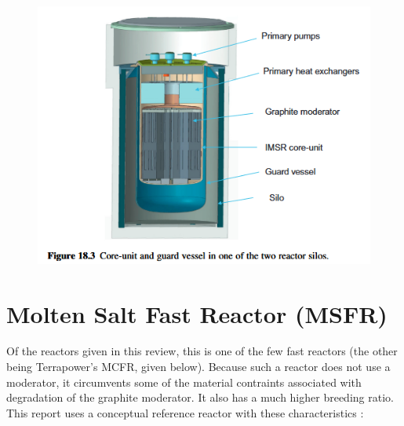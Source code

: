 \documentclass[letterpaper]{article}
\begin{document}
\begin{figure}[H]
  \centering
  \includegraphics[width=1.0\linewidth]{figures/IMSRsource2.png}
  \label{fig:fig9}
\end{figure}

\section{Molten Salt Fast Reactor (MSFR)}
Of the reactors given in this review, this is one of the few fast reactors (the other being Terrapower's MCFR, given below).  Because such a reactor does not use a moderator, it circumvents some of the material contraints associated with degradation of the graphite moderator.  It also has a much higher breeding ratio.  This report uses a conceptual reference reactor with these characteristics \cite{rouch_preliminary_2014}: 
\end{document}
